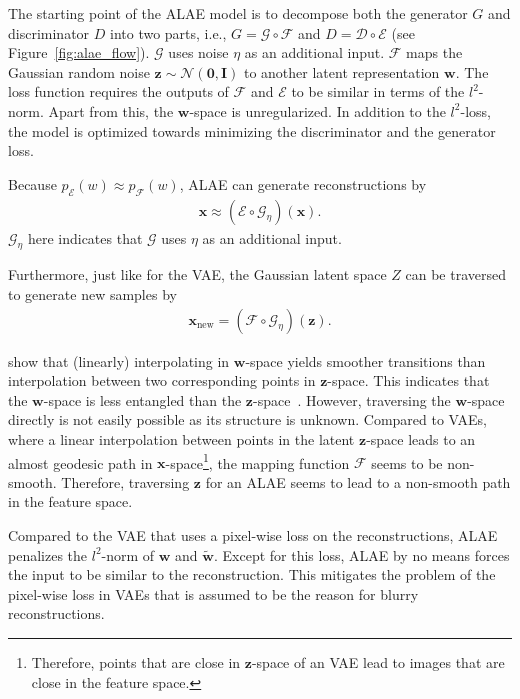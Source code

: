 The starting point of the \ac{ALAE} model is to decompose both the generator $G$ and discriminator $D$ into two parts, i.e., $G=\mathcal{G}\circ \mathcal{F}$ and $D=\mathcal{D}\circ \mathcal{E}$ (see Figure~\ref{fig:alae_flow}).
$\mathcal{G}$ uses noise $\eta$ as an additional input.
$\mathcal{F}$ maps the Gaussian random noise $\bm{z} \sim \mathcal{N}(\bm{0}, \bm{I})$ to another latent representation $\bm{w}$.
The loss function requires the outputs of $\mathcal{F}$ and $\mathcal{E}$ to be similar in terms of the $l^2$-norm.
Apart from this, the $\bm{w}$-space is unregularized.
In addition to the $l^2$-loss, the model is optimized towards minimizing the discriminator and the generator loss.

Because $p_{\mathcal{E}}(w) \approx p_{\mathcal{F}}(w)$, \ac{ALAE} can generate reconstructions by
\begin{align}
    \bm{x}\approx (\mathcal{E}\circ \mathcal{G}_\eta)(\bm{x}).
\end{align}
$\mathcal{G}_\eta$ here indicates that $\mathcal{G}$ uses $\eta$ as an additional input.

Furthermore, just like for the \ac{VAE}, the Gaussian latent space $Z$ can be traversed to generate new samples by
\begin{align}
    \bm{x}_{\text{new}} = (\mathcal{F}\circ \mathcal{G}_\eta)(\bm{z}).
\end{align}

\citet{pidhorskyi2020adversarial} show that (linearly) interpolating in $\bm{w}$-space yields smoother transitions than interpolation between two corresponding points in $\bm{z}$-space.
This indicates that the $\bm{w}$-space is less entangled than the $\bm{z}$-space~\citep{shao2018riemannian,arvanitidis2017latent}.
However, traversing the $\bm{w}$-space directly is not easily possible as its structure is unknown.
Compared to \acp{VAE}, where a linear interpolation between points in the latent $\bm{z}$-space leads to an almost geodesic path in $\bm{x}$-space\footnote{Therefore, points that are close in $\bm{z}$-space of an \ac{VAE} lead to images that are close in the feature space.}, the mapping function $\mathcal{F}$ seems to be non-smooth.
Therefore, traversing $\bm{z}$ for an \ac{ALAE} seems to lead to a non-smooth path in the feature space.

Compared to the \ac{VAE} that uses a pixel-wise loss on the reconstructions, \ac{ALAE} penalizes the $l^2$-norm of $\bm{w}$ and $\tilde{\bm{w}}$.
Except for this loss, \ac{ALAE} by no means forces the input to be similar to the reconstruction.
This mitigates the problem of the pixel-wise loss in \acp{VAE} that is assumed to be the reason for blurry reconstructions.

